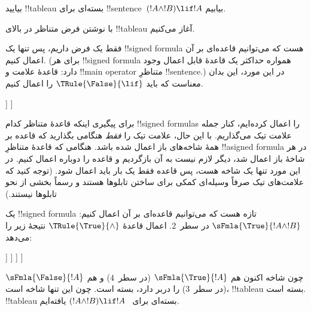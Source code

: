\documentclass[../../../include/open-logic-section]{subfiles}
\begin{document}
      {}
      {}


\begin{ex}
بیایید !!{tableau} بسته‌ای برای !!{sentence}~$(!A \land !B) \lif !A$
بیابیم.

با نوشتن فرض متناظر در بالای !!{tableau} آغاز می‌کنیم.
\begin{oltableau}
  [\sFmla{\False}{(\formula{A} \land \formula{B}) \lif \formula{A}},
    just = \TAss]
\end{oltableau}

فقط یک فرض داریم، پس تنها یک !!{signed formula} هست که می‌توانیم قاعده‌ای
بر آن اعمال کنیم. (برای هر !!{signed formula} همواره حداکثر یک قاعدهٔ
قابل اعمال وجود دارد: قاعدهٔ علامت و !!{main operator} متناظرِ
!!{sentence}.) در این مورد، این بدان معناست که باید
$\TRule{\False}{\lif}$ را اعمال کنیم.
\begin{oltableau}
  [\sFmla{\False}{(\formula{A} \land \formula{B}) \lif \formula{A}},
    checked, just = \TAss
    [\sFmla{\True}{\formula{A} \land \formula{B}},
      just={\TRule{\False}{\lif}[1]}
      [\sFmla{\False}{\formula{A}}, just={\TRule{\False}{\lif}[1]}]
    ]
  ]
\end{oltableau}
برای پیگیری اینکه قاعدهٔ متناظر کدام !!{signed formula}s را اعمال کرده‌ایم،
کنار جمله علامت تیک می‌گذاریم. با این حال، علامت تیک را \emph{فقط} هنگامی
بگذارید که قاعده بر همهٔ شاخه‌های باز اعمال شده باشد. هنگامی که قاعدهٔ
متناظرِ !!a{signed formula} در هر شاخهٔ باز اعمال شد، دیگر لازم نیست به
آن بازگردیم و قاعده را دوباره اعمال کنیم. در این مورد تنها یک شاخه هست،
پس قاعده فقط یک بار باید اعمال شود. (توجه کنید که علامت‌های تیک صرفاً
وسیله‌ای کمکی برای ساختن تابلوها هستند و رسماً بخشی از نحو تابلوها نیستند.)

یک !!{signed formula} تازه هست که می‌توانیم قاعده‌ای بر آن اعمال کنیم:
$\sFmla{\True}{!A \land !B}$ در سطر~$2$. اعمال قاعدهٔ
$\TRule{\True}{\land}$ نتیجهٔ زیر را می‌دهد:
\begin{oltableau}
  [\sFmla{\False}{(\formula{A} \land \formula{B}) \lif \formula{A}},
    checked, just = \TAss
    [\sFmla{\True}{\formula{A} \land \formula{B}},
      just={\TRule{\False}{\lif}[1]}, checked
      [\sFmla{\False}{\formula{A}}, just={\TRule{\False}{\lif}[1]}
        [\sFmla{\True}{\formula{A}}, just={\TRule{\True}{\land}[2]}
          [\sFmla{\True}{\formula{B}}, just={\TRule{\True}{\land}[2]}, close
          ]
        ]
      ]
    ]
  ]
\end{oltableau}
چون شاخه اکنون هم $\sFmla{\True}{!A}$ (در سطر~$4$) و هم
$\sFmla{\False}{!A}$ (در سطر~$3$) را دربر دارد، بسته است. چون این تنها
شاخه است، !!{tableau} بسته است. !!{tableau} بسته‌ای برای
~$(!A \land !B) \lif !A$ یافته‌ایم.
\end{ex}
\end{document}
